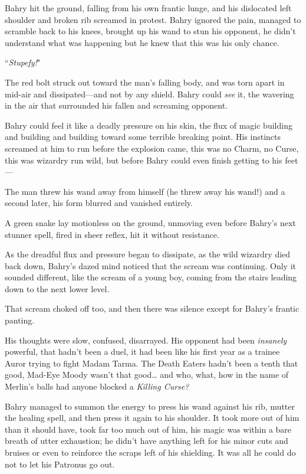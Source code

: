 Bahry hit the ground, falling from his own frantic lunge, and his dislocated left shoulder and broken rib screamed in protest. Bahry ignored the pain, managed to scramble back to his knees, brought up his wand to stun his opponent, he didn't understand what was happening but he knew that this was his only chance.

``\emph{Stupefy!}"

The red bolt struck out toward the man's falling body, and was torn apart in mid-air and dissipated—and not by any shield. Bahry could \emph{see} it, the wavering in the air that surrounded his fallen and screaming opponent.

Bahry could feel it like a deadly pressure on his skin, the flux of magic building and building and building toward some terrible breaking point. His instincts screamed at him to run before the explosion came, this was no Charm, no Curse, this was wizardry run wild, but before Bahry could even finish getting to his feet—

The man threw his wand away from himself (he threw away his wand!) and a second later, his form blurred and vanished entirely.

A green snake lay motionless on the ground, unmoving even before Bahry's next stunner spell, fired in sheer reflex, hit it without resistance.

As the dreadful flux and pressure began to dissipate, as the wild wizardry died back down, Bahry's dazed mind noticed that the scream was continuing. Only it sounded different, like the scream of a young boy, coming from the stairs leading down to the next lower level.

That scream choked off too, and then there was silence except for Bahry's frantic panting.

His thoughts were slow, confused, disarrayed. His opponent had been \emph{insanely} powerful, that hadn't been a duel, it had been like his first year as a trainee Auror trying to fight Madam Tarma. The Death Eaters hadn't been a tenth that good, Mad-Eye Moody wasn't that good{\ldots} and who, what, how in the name of Merlin's balls had anyone blocked a \emph{Killing Curse?}

Bahry managed to summon the energy to press his wand against his rib, mutter the healing spell, and then press it again to his shoulder. It took more out of him than it should have, took far too much out of him, his magic was within a bare breath of utter exhaustion; he didn't have anything left for his minor cuts and bruises or even to reinforce the scraps left of his shielding. It was all he could do not to let his Patronus go out.

